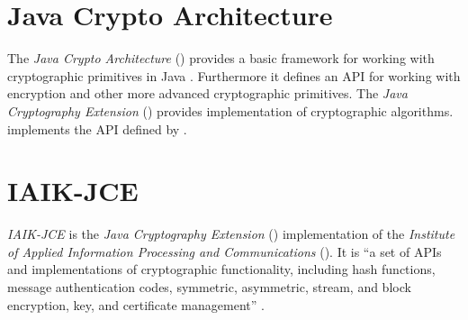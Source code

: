 



\section{Java Crypto Architecture} \label{section:pre:jca}

The \textit{Java Crypto Architecture} () provides a basic framework for working with cryptographic primitives in Java \cite{JCA}. Furthermore it defines an API for working with encryption and other more advanced cryptographic primitives.
The \textit{Java Cryptography Extension} () provides implementation of cryptographic algorithms.  implements the API defined by . 

\section{IAIK-JCE} \label{section:pre:jce} 


\textit{IAIK-JCE} is the \textit{Java Cryptography Extension} ()  implementation of the \textit{Institute of Applied Information Processing and Communications} (). It is ``a set of APIs and implementations of cryptographic functionality, including hash functions, message authentication codes, symmetric, asymmetric, stream, and block encryption, key, and certificate management'' \cite{IAIKJCE}.



